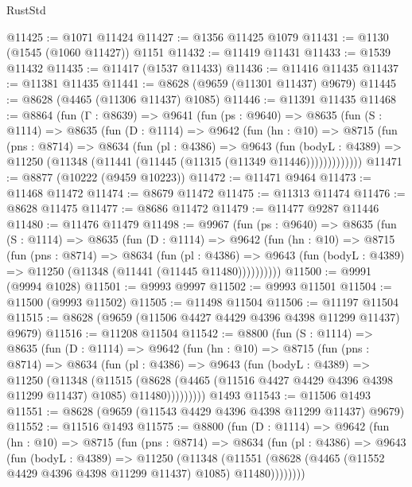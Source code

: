 \begin{lexlean}{RustStd}
\begin{coremodule}
@11425 := @1071 @11424
@11427 := @1356 @11425 @1079
@11431 := @1130 (@1545 (@1060 @11427)) @1151
@11432 := @11419 @11431
@11433 := @1539 @11432
@11435 := @11417 (@1537 @11433)
@11436 := @11416 @11435
@11437 := @11381 @11435
@11441 := @8628 (@9659 (@11301 @11437) @9679)
@11445 := @8628 (@4465 (@11306 @11437) @1085)
@11446 := @11391 @11435
@11468 := @8864
    (fun (Γ : @8639) =>
    @9641
      (fun (ps : @9640) =>
      @8635
        (fun (S : @1114) =>
        @8635
          (fun (D : @1114) =>
          @9642
            (fun (hn : @10) =>
            @8715
              (fun (pns : @8714) =>
              @8634
                (fun (pl : @4386) =>
                @9643
                  (fun (bodyL : @4389) =>
                  @11250 (@11348 (@11441 (@11445 (@11315 (@11349 @11446)))))))))))))
@11471 := @8877 (@10222 (@9459 @10223))
@11472 := @11471 @9464
@11473 := @11468 @11472
@11474 := @8679 @11472
@11475 := @11313 @11474
@11476 := @8628 @11475
@11477 := @8686 @11472
@11479 := @11477 @9287 @11446
@11480 := @11476 @11479
@11498 := @9967
    (fun (ps : @9640) =>
    @8635
      (fun (S : @1114) =>
      @8635
        (fun (D : @1114) =>
        @9642
          (fun (hn : @10) =>
          @8715
            (fun (pns : @8714) =>
            @8634
              (fun (pl : @4386) =>
              @9643 (fun (bodyL : @4389) => @11250 (@11348 (@11441 (@11445 @11480))))))))))
@11500 := @9991 (@9994 @1028)
@11501 := @9993 @9997
@11502 := @9993 @11501
@11504 := @11500 (@9993 @11502)
@11505 := @11498 @11504
@11506 := @11197 @11504
@11515 := @8628 (@9659 (@11506 @4427 @4429 @4396 @4398 @11299 @11437) @9679)
@11516 := @11208 @11504
@11542 := @8800
    (fun (S : @1114) =>
    @8635
      (fun (D : @1114) =>
      @9642
        (fun (hn : @10) =>
        @8715
          (fun (pns : @8714) =>
          @8634
            (fun (pl : @4386) =>
            @9643
              (fun (bodyL : @4389) =>
              @11250
                (@11348
                  (@11515
                    (@8628
                      (@4465 (@11516 @4427 @4429 @4396 @4398 @11299 @11437) @1085)
                      @11480)))))))))
    @1493
@11543 := @11506 @1493
@11551 := @8628 (@9659 (@11543 @4429 @4396 @4398 @11299 @11437) @9679)
@11552 := @11516 @1493
@11575 := @8800
    (fun (D : @1114) =>
    @9642
      (fun (hn : @10) =>
      @8715
        (fun (pns : @8714) =>
        @8634
          (fun (pl : @4386) =>
          @9643
            (fun (bodyL : @4389) =>
            @11250
              (@11348
                (@11551 (@8628 (@4465 (@11552 @4429 @4396 @4398 @11299 @11437) @1085) @11480))))))))

\end{coremodule}
\end{lexlean}
